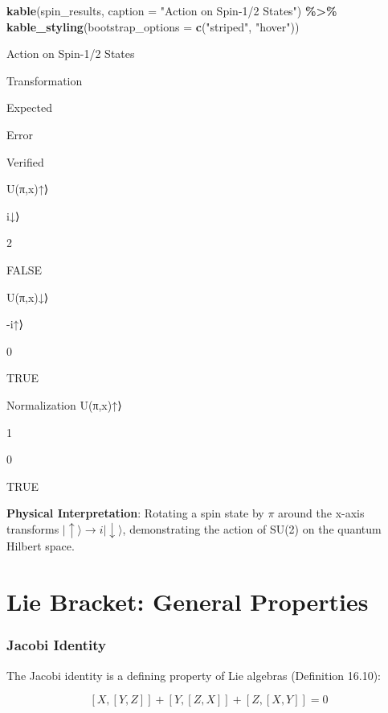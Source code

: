 \documentclass[
]{book}
\newenvironment{Shaded}{\begin{snugshade}}{\end{snugshade}}
\newcommand{\AttributeTok}[1]{\textcolor[rgb]{0.13,0.29,0.53}{#1}}
\newcommand{\FunctionTok}[1]{\textcolor[rgb]{0.13,0.29,0.53}{\textbf{#1}}}
\newcommand{\NormalTok}[1]{#1}
\newcommand{\SpecialCharTok}[1]{\textcolor[rgb]{0.81,0.36,0.00}{\textbf{#1}}}
\newcommand{\StringTok}[1]{\textcolor[rgb]{0.31,0.60,0.02}{#1}}
\theoremstyle{definition}
\theoremstyle{definition}
\theoremstyle{definition}
\theoremstyle{definition}
\theoremstyle{remark}
\begin{document}
\begin{Shaded}
\begin{Highlighting}[]
\FunctionTok{kable}\NormalTok{(spin\_results,}
      \AttributeTok{caption =} \StringTok{"Action on Spin{-}1/2 States"}\NormalTok{) }\SpecialCharTok{\%\textgreater{}\%}
  \FunctionTok{kable\_styling}\NormalTok{(}\AttributeTok{bootstrap\_options =} \FunctionTok{c}\NormalTok{(}\StringTok{"striped"}\NormalTok{, }\StringTok{"hover"}\NormalTok{))}
\end{Highlighting}
\end{Shaded}

\label{tab:spin-states}Action on Spin-1/2 States

Transformation

Expected

Error

Verified

U(π,x)\textbar↑⟩

i\textbar↓⟩

2

FALSE

U(π,x)\textbar↓⟩

-i\textbar↑⟩

0

TRUE

Normalization \textbar U(π,x)\textbar↑⟩\textbar{}

1

0

TRUE

\textbf{Physical Interpretation}: Rotating a spin state by \(\pi\) around the x-axis transforms \(|\uparrow\rangle \to i|\downarrow\rangle\), demonstrating the action of SU(2) on the quantum Hilbert space.

\section{Lie Bracket: General Properties}\label{lie-bracket-general-properties}

\subsubsection{Jacobi Identity}\label{jacobi-identity}

The Jacobi identity is a defining property of Lie algebras (Definition 16.10):

\[[X,[Y,Z]] + [Y,[Z,X]] + [Z,[X,Y]] = 0\]
\end{document}
